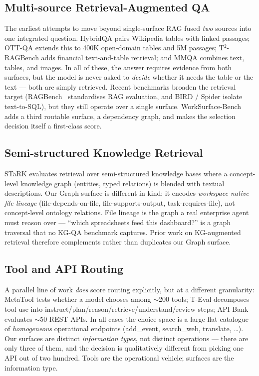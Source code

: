 \documentclass[11pt]{article}
\begin{document}
\subsection{Multi-source Retrieval-Augmented QA}
The earliest attempts to move beyond single-surface RAG fused \emph{two}
sources into one integrated question. HybridQA \citep{chen2020hybridqa} pairs
Wikipedia tables with linked passages; OTT-QA \citep{chen2021ottqa} extends
this to 400K open-domain tables and 5M passages; T$^2$-RAGBench
\citep{isgorur2026t2ragbench} adds financial text-and-table retrieval; and
MMQA \citep{talmor2021mmqa} combines text, tables, and images. In all of
these, the answer requires evidence from both surfaces, but the model is
never asked to \emph{decide} whether it needs the table or the text --- both
are simply retrieved. Recent benchmarks broaden the retrieval target
(RAGBench~\citep{friel2024ragbench} standardises RAG evaluation, and BIRD /
Spider \citep{li2023bird,yu2018spider} isolate text-to-SQL), but they still operate over
a single surface. WorkSurface-Bench adds a third routable surface, a
dependency graph, and makes the selection decision itself a first-class
score.

\subsection{Semi-structured Knowledge Retrieval}
STaRK \citep{wu2024stark} evaluates retrieval over semi-structured knowledge
bases where a concept-level knowledge graph (entities, typed relations)
is blended with textual descriptions. Our Graph surface is different in kind:
it encodes \emph{workspace-native file lineage} (file-depends-on-file,
file-supports-output, task-requires-file), not concept-level ontology
relations. File lineage is the graph a real enterprise agent must reason
over --- ``which spreadsheets feed this dashboard?'' is a graph traversal
that no KG-QA benchmark captures. Prior work on KG-augmented retrieval
therefore complements rather than duplicates our Graph surface.

\subsection{Tool and API Routing}
A parallel line of work \emph{does} score routing explicitly, but at a
different granularity: MetaTool \citep{huang2023metatool} tests whether a
model chooses among $\sim$200 tools; T-Eval \citep{chen2023teval} decomposes
tool use into instruct/plan/reason/retrieve/understand/review steps;
API-Bank \citep{li2023apibank} evaluates $\sim$50 REST APIs. In all cases
the choice space is a large flat catalogue of \emph{homogeneous} operational
endpoints (add\_event, search\_web, translate, \ldots). Our surfaces are
distinct \emph{information types}, not distinct operations --- there are
only three of them, and the decision is qualitatively different from
picking one API out of two hundred. Tools are the operational vehicle;
surfaces are the information type.
\end{document}
